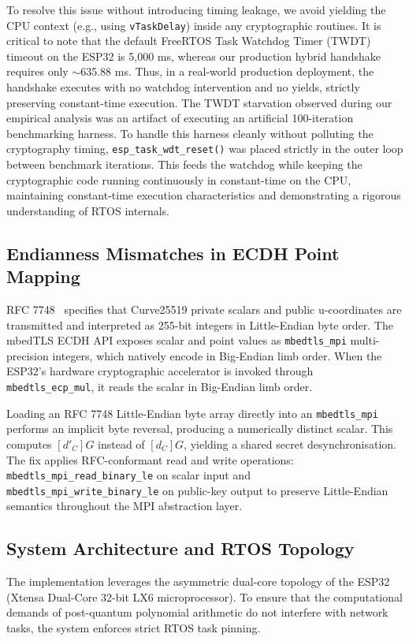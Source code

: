 \documentclass[journal, 10pt]{IEEEtran}
\begin{document}
To resolve this issue without introducing timing leakage, we avoid yielding the CPU context (e.g., using \texttt{vTaskDelay}) inside any cryptographic routines. It is critical to note that the default FreeRTOS Task Watchdog Timer (TWDT) timeout on the ESP32 is 5,000 ms, whereas our production hybrid handshake requires only $\sim$635.88 ms. Thus, in a real-world production deployment, the handshake executes with no watchdog intervention and no yields, strictly preserving constant-time execution. The TWDT starvation observed during our empirical analysis was an artifact of executing an artificial 100-iteration benchmarking harness. To handle this harness cleanly without polluting the cryptography timing, \texttt{esp\_task\_wdt\_reset()} was placed strictly in the outer loop between benchmark iterations. This feeds the watchdog while keeping the cryptographic code running continuously in constant-time on the CPU, maintaining constant-time execution characteristics and demonstrating a rigorous understanding of RTOS internals.

\subsection{Endianness Mismatches in ECDH Point Mapping}
RFC 7748~\cite{b19} specifies that Curve25519 private scalars and public u-coordinates are transmitted and interpreted as 255-bit integers in Little-Endian byte order. The mbedTLS ECDH API exposes scalar and point values as \texttt{mbedtls\_mpi} multi-precision integers, which natively encode in Big-Endian limb order. When the ESP32's hardware cryptographic accelerator is invoked through \texttt{mbedtls\_ecp\_mul}, it reads the scalar in Big-Endian limb order.

Loading an RFC 7748 Little-Endian byte array directly into an \texttt{mbedtls\_mpi} performs an implicit byte reversal, producing a numerically distinct scalar. This computes $[d'_C]G$ instead of $[d_C]G$, yielding a shared secret desynchronisation. The fix applies RFC-conformant read and write operations: \texttt{mbedtls\_mpi\_read\_binary\_le} on scalar input and \texttt{mbedtls\_mpi\_write\_binary\_le} on public-key output to preserve Little-Endian semantics throughout the MPI abstraction layer.

\subsection{System Architecture and RTOS Topology}
The implementation leverages the asymmetric dual-core topology of the ESP32 (Xtensa Dual-Core 32-bit LX6 microprocessor). To ensure that the computational demands of post-quantum polynomial arithmetic do not interfere with network tasks, the system enforces strict RTOS task pinning. 
\end{document}
